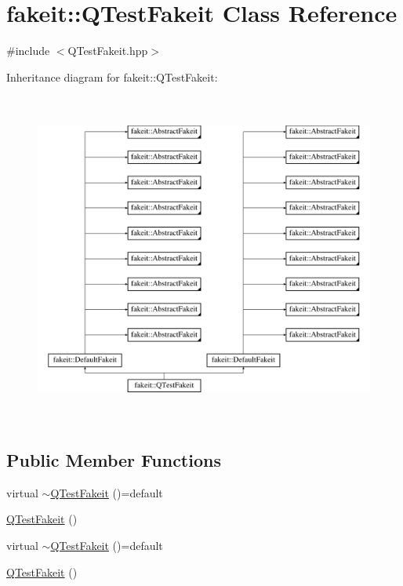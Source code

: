 \hypertarget{classfakeit_1_1QTestFakeit}{}\section{fakeit\+::Q\+Test\+Fakeit Class Reference}
\label{classfakeit_1_1QTestFakeit}


{\ttfamily \#include $<$Q\+Test\+Fakeit.\+hpp$>$}

Inheritance diagram for fakeit\+::Q\+Test\+Fakeit\+:\begin{figure}[H]
\begin{center}
\leavevmode
\includegraphics[height=11.000000cm]{classfakeit_1_1QTestFakeit}
\end{center}
\end{figure}
\subsection*{Public Member Functions}
\begin{DoxyCompactItemize}
\item 
virtual \mbox{\hyperlink{classfakeit_1_1QTestFakeit_a9c1528d576211ff2ef24442cad8b3091}{$\sim$\+Q\+Test\+Fakeit}} ()=default
\item 
\mbox{\hyperlink{classfakeit_1_1QTestFakeit_a44162edc77ddcc6ba3bc2bbd35bdeb9c}{Q\+Test\+Fakeit}} ()
\item 
virtual \mbox{\hyperlink{classfakeit_1_1QTestFakeit_a9c1528d576211ff2ef24442cad8b3091}{$\sim$\+Q\+Test\+Fakeit}} ()=default
\item 
\mbox{\hyperlink{classfakeit_1_1QTestFakeit_a44162edc77ddcc6ba3bc2bbd35bdeb9c}{Q\+Test\+Fakeit}} ()
\end{DoxyCompactItemize}
